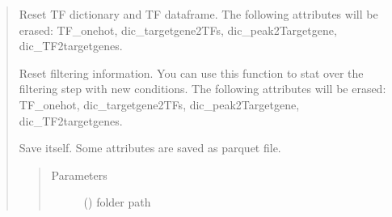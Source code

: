 \documentclass[letterpaper,10pt,english]{sphinxmanual}
\begin{document}
\begin{quote}
\begin{fulllineitems}
\begin{fulllineitems}
\end{fulllineitems}


\begin{fulllineitems}
\label{\detokenize{modules/celloracle.motif_analysis:celloracle.motif_analysis.TFinfo.reset_dictionary_and_df}}
Reset TF dictionary and TF dataframe.
The following attributes will be erased: TF\_onehot, dic\_targetgene2TFs, dic\_peak2Targetgene, dic\_TF2targetgenes.

\end{fulllineitems}


\begin{fulllineitems}
\label{\detokenize{modules/celloracle.motif_analysis:celloracle.motif_analysis.TFinfo.reset_filtering}}
Reset filtering information.
You can use this function to stat over the filtering step with new conditions.
The following attributes will be erased: TF\_onehot, dic\_targetgene2TFs, dic\_peak2Targetgene, dic\_TF2targetgenes.

\end{fulllineitems}


\begin{fulllineitems}
\label{\detokenize{modules/celloracle.motif_analysis:celloracle.motif_analysis.TFinfo.save_as_parquet}}
Save itself. Some attributes are saved as parquet file.
\begin{quote}\begin{description}
\item[{Parameters}] \leavevmode
{} () \textendash{} folder path


\end{description}
\end{quote}
\end{fulllineitems}
\end{fulllineitems}
\end{quote}
\end{document}
